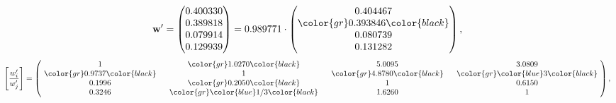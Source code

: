 \begin{example}
\begin{equation*}
\mathbf{w}^{\prime} =
\begin{pmatrix}
0.400330\\
0.389818\\
0.079914\\
0.129939
\end{pmatrix} =
0.989771\cdot
\begin{pmatrix}
0.404467\\
\color{gr} 0.393846\color{black} \\
0.080739\\
0.131282
\end{pmatrix},
\end{equation*}
\begin{equation*}
\left[ \frac{{w}^{\prime}_i}{{w}^{\prime}_j} \right] =
\begin{pmatrix}
$\,\,$ 1 $\,\,$ & $\,\,$\color{gr} 1.0270\color{black} $\,\,$ & $\,\,$5.0095$\,\,$ & $\,\,$3.0809$\,\,$ \\
$\,\,$\color{gr} 0.9737\color{black} $\,\,$ & $\,\,$ 1 $\,\,$ & $\,\,$\color{gr} 4.8780\color{black} $\,\,$ & $\,\,$\color{gr} \color{blue} 3\color{black}   $\,\,$ \\
$\,\,$0.1996$\,\,$ & $\,\,$\color{gr} 0.2050\color{black} $\,\,$ & $\,\,$ 1 $\,\,$ & $\,\,$0.6150 $\,\,$ \\
$\,\,$0.3246$\,\,$ & $\,\,$\color{gr} \color{blue}  1/3\color{black} $\,\,$ & $\,\,$1.6260$\,\,$ & $\,\,$ 1  $\,\,$ \\
\end{pmatrix},
\end{equation*}
\end{example}
\newpage
